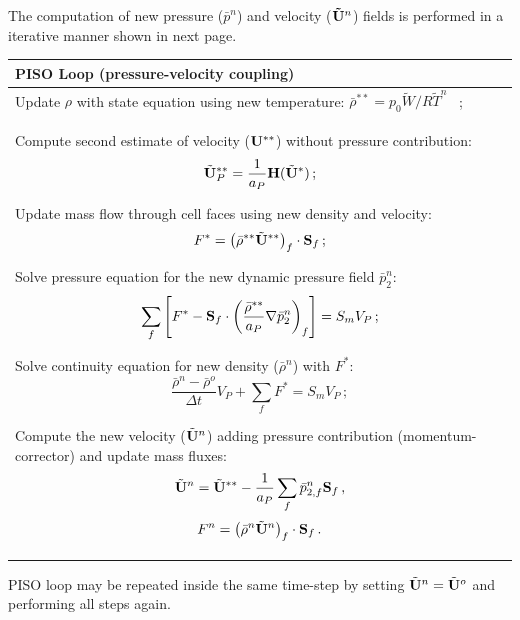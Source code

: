 The computation of new pressure ($\bar{p}^n$) and velocity ($\mathbf{\tilde{U}}^n$) fields is performed in a iterative manner shown in next page.

\begin{tabular}{|p{}|} \hline
\textbf{PISO Loop (pressure-velocity coupling)} \\
\hline
Update $\rho$ with state equation using new temperature: $\bar{\rho}^{**} = p_0 \tilde{W} / R \tilde{T}^{n}$ \, ;\\
Compute second estimate of velocity ($\mathbf{U}^{**}$) without pressure contribution:
\begin{equation}
\tilde{\mathbf{U}}_P^{**} = \frac{1}{a_P}\mathbf{H}(\tilde{\mathbf{U}}^{*}) \, ;
\end{equation}

Update mass flow through cell faces using new density and velocity:
\begin{equation}
F^{*}=\left(\bar{\rho}^{**}\tilde{\mathbf{U}}^{**}\right)_f\cdot \mathbf{S}_f \, ;
\end{equation}

Solve pressure equation for the new dynamic pressure field $\bar{p}_2^n$:
\begin{equation}
  \sum_f \left[ F^{*} - \mathbf{S}_f\cdot\left(\frac{\bar{\rho}^{**}}{a_P}\nabla \bar{p}_2^{n} \right)_f \right] = S_m V_P \, ;
\end{equation}

Solve continuity equation for new density ($\bar{\rho}^n$) with $F^{*}$:
\begin{equation}
\frac{\bar{\rho}^{n}-\bar{\rho}^{o}}{\Delta t} V_P +\sum_f F^{*} = S_m V_P \, ;
\end{equation}

Compute the new velocity ($\tilde{\mathbf{U}}^{n}$) adding pressure contribution (momentum-corrector) and update mass fluxes:
\begin{equation}
\tilde{\mathbf{U}}^{n} = \tilde{\mathbf{U}}^{**} - \frac{1}{a_P}\sum_f \bar{p}_{2,f}^{n}\mathbf{S}_f \, ,
\end{equation}
\begin{equation}
 F^{n}=\left(\bar{\rho}^{n}\tilde{\mathbf{U}}^{n}\right)_f\cdot \mathbf{S}_f \, .
\end{equation}\\
\hline
\end{tabular}
PISO loop may be repeated inside the same time-step by setting $\tilde{\mathbf{U}}^{n}=\tilde{\mathbf{U}}^{o}$ and performing all steps again.

